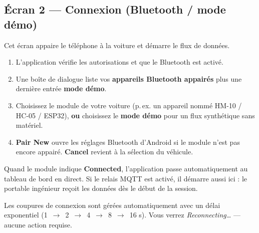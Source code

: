 \documentclass[11pt,a4paper,oneside]{report}
\newcommand{\arrow}{\,$\rightarrow$\,}
\begin{document}
\subsection{Écran 2 --- Connexion (Bluetooth / mode démo)}
Cet écran appaire le téléphone à la voiture et démarre le flux de données.
\begin{enumerate}
  \item L'application vérifie les autorisations et que le Bluetooth est activé.
  \item Une boîte de dialogue liste vos \textbf{appareils Bluetooth appairés} plus
    une dernière entrée \textbf{mode démo}.
  \item Choisissez le module de votre voiture (p.\,ex. un appareil nommé HM-10 /
    HC-05 / ESP32), \textbf{ou} choisissez le \textbf{mode démo} pour un flux
    synthétique sans matériel.
  \item \textbf{Pair New} ouvre les réglages Bluetooth d'Android si le module n'est
    pas encore appairé. \textbf{Cancel} revient à la sélection du véhicule.
\end{enumerate}
Quand le module indique \textbf{Connected}, l'application passe automatiquement au
tableau de bord en direct. Si le relais MQTT est activé, il démarre aussi ici : le
portable ingénieur reçoit les données dès le début de la session.
\begin{tgnote}
Les coupures de connexion sont gérées automatiquement avec un délai exponentiel
(1 \arrow{} 2 \arrow{} 4 \arrow{} 8 \arrow{} 16 s). Vous verrez
\emph{Reconnecting\ldots} --- aucune action requise.
\end{tgnote}
\end{document}

